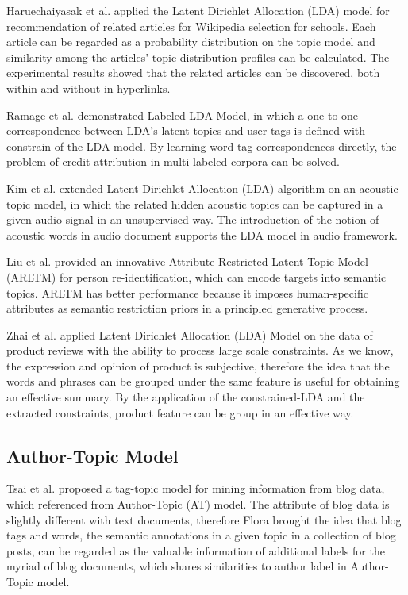 Haruechaiyasak et al. \cite{haruechaiyasak2008article} applied the Latent Dirichlet Allocation (LDA) model for recommendation of related articles for Wikipedia selection for schools. Each article can be regarded as a probability distribution on the topic model and similarity among the articles’ topic distribution profiles can be calculated. The experimental results showed that the related articles can be discovered, both within and without in hyperlinks. 

Ramage et al. \cite{ramage2009labeled} demonstrated Labeled LDA Model, in which a one-to-one correspondence between LDA’s latent topics and user tags is defined with constrain of the LDA model. By learning word-tag correspondences directly, the problem of credit attribution in multi-labeled corpora can be solved.

Kim et al. \cite{kim2009acoustic} extended Latent Dirichlet Allocation (LDA) algorithm on an acoustic topic model, in which the related hidden acoustic topics can be captured in a given audio signal in an unsupervised way. The introduction of the notion of acoustic words in audio document supports the LDA model in audio framework.

Liu et al. \cite{liu2012attribute} provided an innovative Attribute Restricted Latent Topic Model (ARLTM) for person re-identification, which can encode targets into semantic topics. ARLTM has better performance because it imposes human-specific attributes as semantic restriction priors in a principled generative process.

Zhai et al. \cite{zhai2011constrained} applied Latent Dirichlet Allocation (LDA) Model on the data of product reviews with the ability to process large scale constraints. As we know, the expression and opinion of product is subjective, therefore the idea that the words and phrases can be grouped under the same feature is useful for obtaining an effective summary. By the application of the constrained-LDA and the extracted constraints, product feature can be group in an effective way.

\subsection{Author-Topic Model}
\label{subsec:atmApplication}

Tsai et al. \cite{tsai2011tag} proposed a tag-topic model for mining information from blog data, which referenced from Author-Topic (AT) model. The attribute of blog data is slightly different with text documents, therefore Flora brought the idea that blog tags and words, the semantic annotations in a given topic in a collection of blog posts, can be regarded as the valuable information of additional labels for the myriad of blog documents, which shares similarities to author label in Author-Topic model. 

